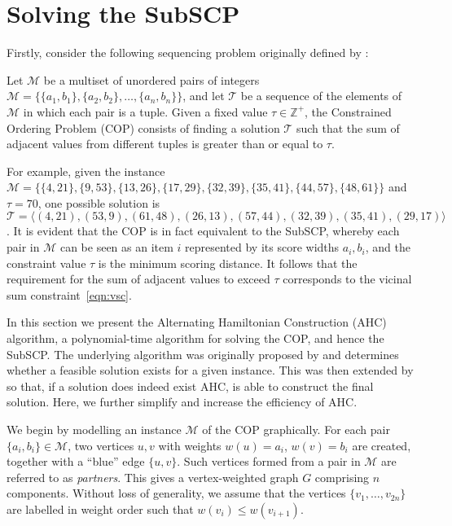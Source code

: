 \documentclass[authoryear]{elsarticle}
\begin{document}
\section{Solving the SubSCP}
\label{sec:ahc}
\noindent Firstly, consider the following sequencing problem originally defined by \citet{hawa2018}:

\begin{definition} %
	\label{defn:cop}
	Let $\mathcal{M}$ be a multiset of unordered pairs of integers $\mathcal{M} = \{\{a_1, b_1\}, \{a_2, b_2\},\dotsc,\{a_n, b_n\}\}$, and let $\mathcal{T}$ be a sequence of the elements of $\mathcal{M}$ in which each pair is a tuple. Given a fixed value $\tau \in \mathbb{Z}^+$, the Constrained Ordering Problem (COP) consists of finding a solution $\mathcal{T}$ such that the sum of adjacent values from different tuples is greater than or equal to $\tau$.
\end{definition}

\noindent For example, given the instance $\mathcal{M} = \{\{4,21\}, \{9,53\}, \{13,26\}, \{17,29\}, \{32,39\}, \{35,41\}, \{44,57\}, \{48,61\} \}$ and $\tau = 70$, one possible solution is $\mathcal{T} = \langle(4,21), (53,9), (61,48), (26,13), (57,44), (32,39), (35,41), (29,17)\rangle$. It is evident that the COP is in fact equivalent to the SubSCP, whereby each pair in $\mathcal{M}$ can be seen as an item $i$ represented by its score widths $a_i, b_i$, and the constraint value $\tau$ is the minimum scoring distance. It follows that the requirement for the sum of adjacent values to exceed $\tau$ corresponds to the vicinal sum constraint~\eqref{eqn:vsc}.

In this section we present the Alternating Hamiltonian Construction (AHC) algorithm, a polynomial-time algorithm for solving the COP, and hence the SubSCP. The underlying algorithm was originally proposed by \citet{becker2010} and determines whether a feasible solution exists for a given instance. This was then extended by \citet{hawa2018} so that, if a solution does indeed exist AHC, is able to construct the final solution. Here, we further simplify and increase the efficiency of AHC.


We begin by modelling an instance $\mathcal{M}$ of the COP graphically. For each pair $\{a_i, b_i\} \in \mathcal{M}$, two vertices $u, v$ with weights $w(u) = a_i$, $w(v) = b_i$ are created, together with a ``blue'' edge $\{u, v\}$. Such vertices formed from a pair in $\mathcal{M}$ are referred to as \textit{partners}. This gives a vertex-weighted graph $G$ comprising $n$ components. Without loss of generality, we assume that the vertices $\{v_1,\dotsc,v_{2n}\}$ are labelled in weight order such that $w(v_i) \leq w(v_{i+1})$.
\end{document}
